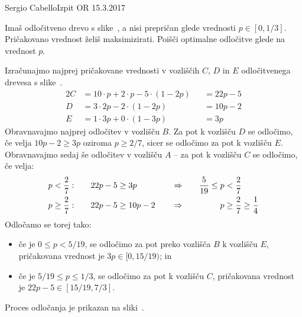 \begin{naloga}{Sergio Cabello}{Izpit OR 15.3.2017}
\begin{vprasanje}
Imaš odločitveno drevo s slike~\fig{},
a nisi prepričan glede vrednosti $p \in [0, 1/3]$.
Pričakovano vrednost želiš maksimizirati.
Poišči optimalne odločitve glede na vrednost $p$.

\begin{slika}
\pgfslika
{}
\end{slika}
\end{vprasanje}

\begin{odgovor}
Izračunajmo najprej pričakovane vrednosti v vozliščih $C$, $D$ in $E$
odločitvenega drevesa s slike~\fig{}.
\begin{alignat*}{2}
C &= 10 \cdot p + 2 \cdot p - 5 \cdot (1-2p) &&= 22p - 5 \\
D &= 3 \cdot 2p - 2 \cdot (1-2p) &&= 10p - 2 \\
E &= 1 \cdot 3p + 0 \cdot (1 - 3p) &&= 3p
\end{alignat*}
Obravnavajmo najprej odločitev v vozlišču $B$.
Za pot k vozlišču $D$ se odločimo,
če velja $10p - 2 \ge 3p$ oziroma $p \ge 2/7$,
sicer se odločimo za pot k vozlišču $E$.
Obravnavajmo sedaj še odločitev v vozlišču $A$
-- za pot k vozlišču $C$ se odločimo, če velja:
\begin{alignat*}{4}
p < {2 \over 7}: &\quad& 22p - 5 &\ge 3p
&\quad&\Rightarrow \quad & {5 \over 19} \le p &< {2 \over 7} \\
p \ge {2 \over 7}: &\quad& 22p - 5 &\ge 10p-2
&\quad&\Rightarrow \quad & p &\ge {2 \over 7} \ge {1 \over 4}
\end{alignat*}
Odločamo se torej tako:
\begin{itemize}
\item če je $0 \le p < 5/19$,
se odločimo za pot preko vozlišča $B$ k vozlišču $E$,
pričakovana vrednost je $3p \in [0, 15/19)$; in
\item če je $5/19 \le p \le 1/3$,
se odločimo za pot k vozlišču $C$,
pričakovana vrednost je $22p-5 \in [15/19, 7/3]$.
\end{itemize}
Proces odločanja je prikazan na sliki~.

\begin{slika}
\end{slika}
\end{odgovor}
\end{naloga}
